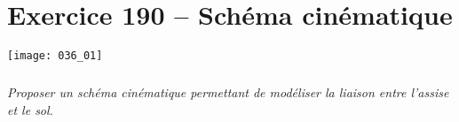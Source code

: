 \section*{Exercice 190 -- Schéma cinématique}
\setcounter{exo}{0}


\begin{center}
\texttt{[image: 036\_01]}
\end{center}

\subparagraph{}
\textit{Proposer un schéma cinématique permettant de modéliser la liaison entre l'assise et le sol.}
\ifprof
\begin{corrige}

\end{corrige}
\else
\fi

